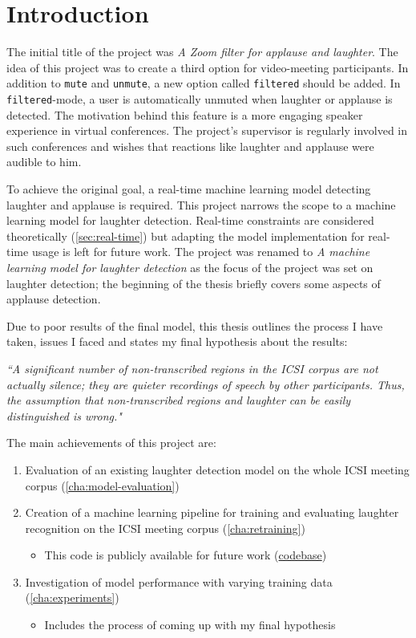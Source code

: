 \documentclass[bsc,frontabs,parskip,deptreport]{infthesis}
\newcommand{\coderepo}{\href{https://github.com/LasseWolter/laughter-detection-icsi}{codebase}}
\begin{document}
\chapter{Introduction} \label{sec:intro}

The initial title of the project was \textit{A Zoom filter for applause and laughter}. The idea of this project was to create a third option for video-meeting participants. In addition to \texttt{mute} and \texttt{unmute}, a new option called \texttt{filtered} should be added.
In \texttt{filtered}-mode, a user is automatically unmuted when laughter or applause is detected. 
The motivation behind this feature is a more engaging speaker experience in virtual conferences. The project's supervisor is regularly involved in such conferences and wishes that reactions like laughter and applause were audible to him.

To achieve the original goal, a real-time machine learning model detecting laughter and applause is required.  
This project narrows the scope to a machine learning model for laughter detection. Real-time constraints are considered theoretically (\autoref{sec:real-time}) but adapting the model implementation for real-time usage is left for future work.
The project was renamed to \textit{A machine learning model for laughter detection} as the focus of the project was set on laughter detection; the beginning of the thesis briefly covers some aspects of applause detection. 

Due to poor results of the final model, this thesis outlines the process I have taken, issues I faced and states my final hypothesis about the results: 

\textit{``A significant number of non-transcribed regions in the ICSI corpus are not actually silence; they are quieter recordings of speech by other participants. Thus, the assumption that non-transcribed regions and laughter can be easily distinguished is wrong."}

The main achievements of this project are:
\begin{enumerate}
  \item Evaluation of an existing laughter detection model on the whole ICSI meeting corpus (\autoref{cha:model-evaluation})
  \item Creation of a machine learning pipeline for training and evaluating laughter recognition on the ICSI meeting corpus (\autoref{cha:retraining})
  \begin{itemize}
      \item This code is publicly available for future work (\coderepo)
  \end{itemize}
  \item Investigation of model performance with varying training data (\autoref{cha:experiments})
  \begin{itemize}
      \item Includes the process of coming up with my final hypothesis 
  \end{itemize}
\end{enumerate}
\end{document}
